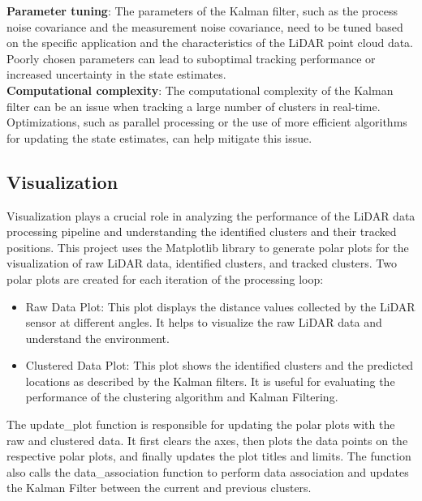 \documentclass[journal]{IEEEtran} %
\begin{document}
\textbf{Parameter tuning}: The parameters of the Kalman filter, such as the process noise covariance and the measurement noise covariance, need to be tuned based on the specific application and the characteristics of the LiDAR point cloud data. Poorly chosen parameters can lead to suboptimal tracking performance or increased uncertainty in the state estimates.\\

\textbf{Computational complexity}: The computational complexity of the Kalman filter can be an issue when tracking a large number of clusters in real-time. Optimizations, such as parallel processing or the use of more efficient algorithms for updating the state estimates, can help mitigate this issue.

\subsection{Visualization}

Visualization plays a crucial role in analyzing the performance of the LiDAR data processing pipeline and understanding the identified clusters and their tracked positions. This project uses the Matplotlib library to generate polar plots for the visualization of raw LiDAR data, identified clusters, and tracked clusters. Two polar plots are created for each iteration of the processing loop:

\begin{itemize}

\item Raw Data Plot: This plot displays the distance values collected by the LiDAR sensor at different angles. It helps to visualize the raw LiDAR data and understand the environment.\\

\item Clustered Data Plot: This plot shows the identified clusters and the predicted locations as described by the Kalman filters. It is useful for evaluating the performance of the clustering algorithm and Kalman Filtering.\\

\end{itemize}

The update\_plot function is responsible for updating the polar plots with the raw and clustered data. It first clears the axes, then plots the data points on the respective polar plots, and finally updates the plot titles and limits. The function also calls the data\_association function to perform data association and updates the Kalman Filter between the current and previous clusters.
\end{document}
